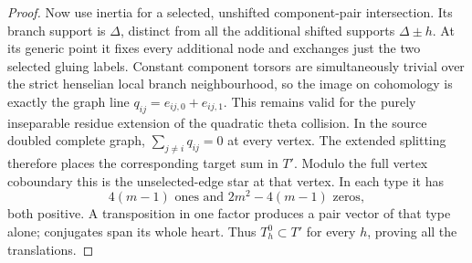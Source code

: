 \begin{proof}
Now use inertia for a selected, unshifted component-pair
intersection. Its branch support is $\Delta$, distinct from all
the additional shifted supports $\Delta\pm h$. At its generic
point it fixes every additional node and exchanges just the two
selected gluing labels. Constant component torsors are simultaneously
trivial over the strict henselian local branch neighbourhood,
so the image on cohomology is exactly the graph line
$q_{ij}=e_{ij,0}+e_{ij,1}$. This remains valid for the purely
inseparable residue extension of the quadratic theta collision.
In the source doubled complete graph,
$\sum_{j\ne i}q_{ij}=0$ at every vertex. The extended splitting
therefore places the corresponding target sum in $T'$.
Modulo the full vertex coboundary this is the unselected-edge
star at that vertex. In each type it has
\[
                 4(m-1)\text{ ones and }
                 2m^2-4(m-1)\text{ zeros},
\]
both positive. A transposition in one factor produces a pair
vector of that type alone; conjugates span its whole heart.
Thus $T_h^0\subset T'$ for every $h$, proving all the translations.
\end{proof}

